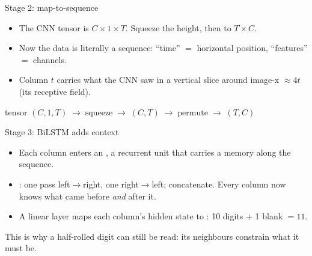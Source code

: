 \documentclass[10pt,aspectratio=169]{beamer}
\begin{document}
\begin{frame}{Stage 2: map-to-sequence}
  \begin{itemize}
    \item The CNN tensor is $C\times 1\times T$. Squeeze the height, then  to $T\times C$.
    \item Now the data is literally a sequence: ``time'' $=$ horizontal position, ``features'' $=$ channels.
    \item Column $t$ carries what the CNN saw in a vertical slice around image-x $\approx 4t$ (its receptive field).
  \end{itemize}
  \begin{mathbox}
    tensor $(C,1,T) \;\to\; \text{squeeze} \;\to\; (C,T) \;\to\; \text{permute} \;\to\; (T,C)$
  \end{mathbox}
\end{frame}

\begin{frame}{Stage 3: BiLSTM adds context}
  \begin{itemize}
    \item Each column enters an , a recurrent unit that carries a memory along the sequence.
    \item {}: one pass left$\to$right, one right$\to$left; concatenate. Every column now
          knows what came before \emph{and} after it.
    \item A linear layer maps each column's hidden state to : 10 digits $+$ 1 blank $= 11$.
  \end{itemize}
  \begin{goodbox}
    This is why a half-rolled digit can still be read: its neighbours constrain what it must be.
  \end{goodbox}
\end{frame}
\end{document}
